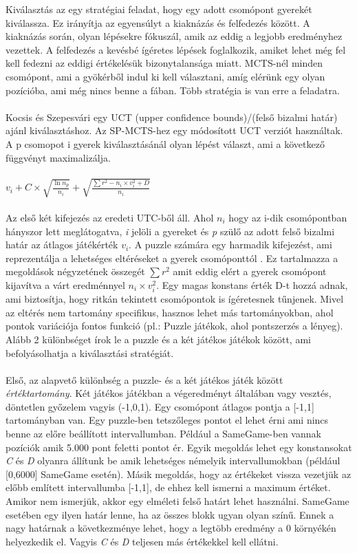 \documentclass{article}
\begin{document}
	Kiválasztás az egy stratégiai feladat, hogy egy adott csomópont gyerekét kiválassza. Ez irányítja az egyensúlyt a kiaknázás és felfedezés között. A kiaknázás során, olyan lépésekre fókuszál, amik az eddig a legjobb eredményhez vezettek. A felfedezés a kevésbé ígéretes lépések foglalkozik, amiket lehet még fel kell fedezni az eddigi értékelésük bizonytalansága miatt. MCTS-nél minden csomópont, ami a gyökérből indul ki kell választani, amíg elérünk egy olyan pozícióba, ami még nincs benne a fában. Több stratégia is van erre a feladatra. \cite{chaslot2006monte} \cite{coulom2006efficient} \cite{kocsis2006bandit}
	\\
	\\
	Kocsis és Szepesvári \cite{kocsis2006bandit} egy UCT (upper confidence bounds)/(felső bizalmi határ) ajánl kiválasztáshoz. Az SP-MCTS-hez egy módosított UCT verziót használtak. A p csomopot i gyerek kiválasztásánál olyan lépést választ, ami a következő függvényt maximalizálja.
	\\
	\\
	\begin{math}
	 v_i+C\times\sqrt{\frac{\ln{n_p}}{n_i}}+\sqrt{\frac{\sum{r^2-n_i \times v_i^2+D}}{n_i}}
	\end{math}
	\\
	\\
	Az első két kifejezés az eredeti UTC-ből áll. Ahol $n_i$  hogy az i-dik csomópontban hányszor lett meglátogatva, \emph{i} jelöli a gyereket és \emph{p} szülő az adott felső bizalmi határ az átlagos játékérték $v_i$. A puzzle számára egy harmadik kifejezést, ami reprezentálja a lehetséges eltéréseket a gyerek csomóponttól \cite{chaslot2006monte} \cite{coulom2006efficient}. Ez tartalmazza a megoldások négyzetének összegét $\sum{r^2}$ amit eddig elért a gyerek csomópont kijavítva a várt eredménnyel $n_i \times v_i^2$. Egy magas konstans érték D-t hozzá adnak, ami biztosítja, hogy ritkán tekintett  csomópontok is ígéretesnek tűnjenek. Mivel az eltérés nem tartomány specifikus, hasznos lehet más tartományokban, ahol pontok variációja fontos funkció (pl.: Puzzle játékok, ahol pontszerzés a lényeg). Alább 2 különbséget írok le a puzzle és a két játékos játékok között, ami befolyásolhatja a kiválasztási stratégiát.
	\\
	\\
	Első, az alapvető különbség a puzzle- és a két játékos játék között \emph{értéktartomány}. Két játékos játékban a végeredményt általában vagy vesztés, döntetlen győzelem vagyis (-1,0,1). Egy csomópont átlagos pontja a [-1,1] tartományban van. Egy puzzle-ben tetszőleges pontot el lehet érni ami nincs benne az előre beállított intervallumban. Például a SameGame-ben vannak pozíciók amik 5.000 pont feletti pontot ér. Egyik megoldás lehet egy konstansokat \emph{C} és \emph{D} olyanra állítunk be amik lehetséges némelyik intervallumokban (például [0,6000] SameGame esetén).  Másik megoldás, hogy az értékeket vissza vezetjük az előbb említett intervallumba [-1,1], de ehhez kell ismerni a maximum értéket. Amikor nem ismerjük, akkor egy elméleti felső határt lehet használni. SameGame esetében egy ilyen határ lenne, ha az összes blokk ugyan olyan színű. Ennek a nagy határnak a következménye lehet, hogy a legtöbb eredmény a 0 környékén helyezkedik el. Vagyis \emph{C} és \emph{D} teljesen más értékekkel kell ellátni.
\end{document}
